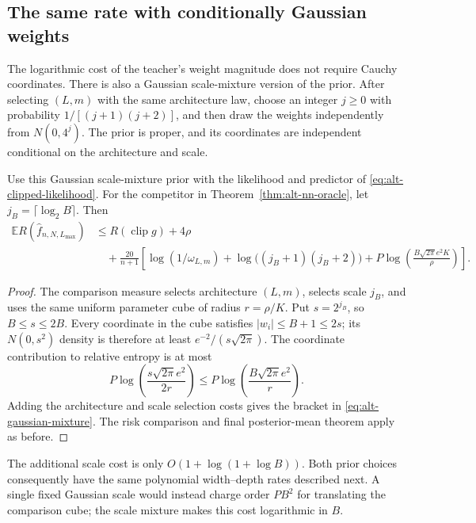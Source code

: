 \subsection{The same rate with conditionally Gaussian weights}

The logarithmic cost of the teacher's weight magnitude does not require
Cauchy coordinates.  There is also a Gaussian scale-mixture version of
the prior.  After selecting $(L,m)$ with the same architecture law,
choose an integer $j\ge0$ with probability $1/[(j+1)(j+2)]$, and then
draw the weights independently from $N(0,4^j)$.  The prior is proper,
and its coordinates are independent conditional on the architecture
and scale.

\begin{corollary}
\label{cor:alt-gaussian-mixture}
Use this Gaussian scale-mixture prior with the likelihood and predictor
of \eqref{eq:alt-clipped-likelihood}.  For the competitor in
Theorem~\ref{thm:alt-nn-oracle}, let
$j_B=\lceil\log_2 B\rceil$.  Then
\begin{align}
 \mathbb E R(\widehat f_{n,N,L_{\max}})
 &\le R(\operatorname{clip}g)+4\rho\\
 &\quad+\frac{20}{n+1}\left[
   \log(1/\omega_{L,m})
   +\log\bigl((j_B+1)(j_B+2)\bigr)
   +P\log\left(\frac{B\sqrt{2\pi}e^2K}{\rho}\right)
                           \right].
 \label{eq:alt-gaussian-mixture}
\end{align}
\end{corollary}

\begin{proof}
The comparison measure selects architecture $(L,m)$, selects scale
$j_B$, and uses the same uniform parameter cube of radius $r=\rho/K$.
Put $s=2^{j_B}$, so $B\le s\le2B$.
Every coordinate in the cube satisfies $|w_i|\le B+1\le2s$; its
$N(0,s^2)$ density is therefore at least
$e^{-2}/(s\sqrt{2\pi})$.  The coordinate contribution to relative
entropy is at most
\[
 P\log\left(\frac{s\sqrt{2\pi}e^2}{2r}\right)
 \le P\log\left(\frac{B\sqrt{2\pi}e^2}{r}\right).
\]
Adding the architecture and scale selection costs gives the bracket
in \eqref{eq:alt-gaussian-mixture}.  The risk comparison and final
posterior-mean theorem apply as before.
\end{proof}

The additional scale cost is only
$O(1+\log(1+\log B))$.  Both prior choices consequently have the
same polynomial width--depth rates described next.  A single fixed
Gaussian scale would instead charge order $PB^2$ for translating the
comparison cube; the scale mixture makes this cost logarithmic in $B$.

